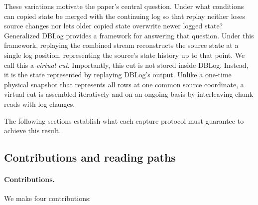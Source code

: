 \documentclass[sigconf,nonacm,10pt]{acmart}
\theoremstyle{plain}
\theoremstyle{definition}
\begin{document}
These variations motivate the paper's central question. Under what
conditions can copied state be merged with the continuing log so that
replay neither loses source changes nor lets older copied state
overwrite newer logged state? Generalized DBLog provides a framework
for answering that question. Under this framework, replaying the combined stream reconstructs the
source state at a single log position, representing the source's state 
history up to that point. We call this a \emph{virtual cut}. Importantly, 
this cut is not stored inside DBLog. Instead, it is the state represented 
by replaying DBLog's output. Unlike a one-time physical snapshot
that represents all rows at one common source coordinate, a virtual cut is assembled
iteratively and on an ongoing basis by interleaving chunk reads with log changes.

The following sections establish what each capture protocol must guarantee to achieve this result.

\subsection{Contributions and reading paths}

\paragraph{Contributions.}
We make four contributions:
\end{document}
